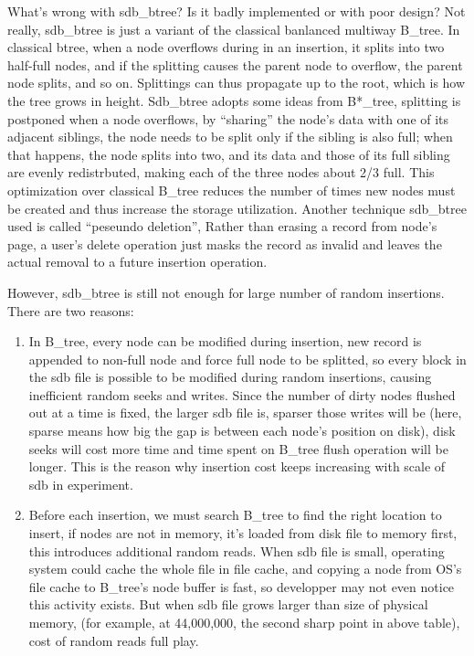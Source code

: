 \documentclass[a4paper,10pt]{article}
\begin{document}
What's wrong with sdb\_btree? Is it badly implemented or with poor design? Not really, sdb\_btree is just a variant of the classical banlanced multiway B\_tree. 
In classical btree, when a node overflows during in an insertion, it splits into two half-full nodes, and if the splitting causes the parent node to overflow, the parent node splits, and so on.
Splittings can thus propagate up to the root, which is how the tree grows in height. Sdb\_btree adopts some ideas from B*\_tree, splitting is postponed when a node overflows,
by ``sharing'' the node's data with one of its adjacent siblings, the node needs to be split only if the sibling is also full;
when that happens, the node splits into two, and its data and those of its full sibling are evenly redistrbuted, making each of the three nodes about 2/3 full.
This optimization over classical B\_tree reduces the number of times new nodes must be created and thus increase the storage utilization.
Another technique sdb\_btree used is called ``peseundo deletion'', Rather than erasing a record from node's page, 
a user's delete operation just masks the record as invalid and leaves the actual removal to a future insertion operation.

However, sdb\_btree is still not enough for large number of random insertions. There are two reasons:
\begin{enumerate}
\item In B\_tree, every node can be modified during insertion, new record is appended to non-full node and force full node to be splitted,
so every block in the sdb file is possible to be modified during random insertions, causing inefficient random seeks and writes.
Since the number of dirty nodes flushed out at a time is fixed, the larger sdb file is, sparser those writes will be (here, sparse means how big the gap is between each node's position on disk),
disk seeks will cost more time and time spent on B\_tree flush operation will be longer. This is the reason why insertion cost keeps increasing with scale of sdb in experiment.
\item Before each insertion, we must search B\_tree to find the right location to insert, if nodes are not in memory, it's loaded from disk file to memory first, this introduces additional random reads.
When sdb file is small, operating system could cache the whole file in file cache, and copying a node from OS's file cache to B\_tree's node buffer is fast, so developper may not even notice this activity exists.
But when sdb file grows larger than size of physical memory, (for example, at 44,000,000, the second sharp point in above table), cost of random reads full play.
\end{enumerate}
\end{document}
